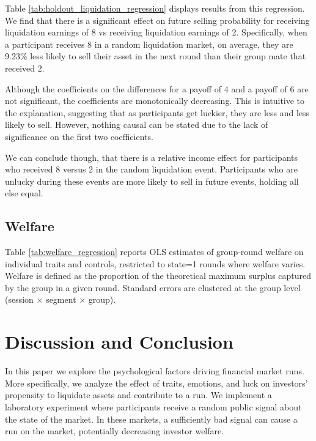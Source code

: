 \documentclass[11pt]{article}
\begin{document}
\begin{table}[H]
  \centering
  \caption{Effect of holdout liquidation payoff on next-round selling}
  \label{tab:holdout_liquidation_regression}
  
\end{table}

Table \ref{tab:holdout_liquidation_regression} displays results from this regression. We find that there is a significant effect on future selling probability for receiving liquidation earnings of 8 vs receiving liquidation earnings of 2. Specifically, when a participant receives 8 in a random liquidation market, on average, they are 9.23\% less likely to sell their asset in the next round than their group mate that received 2.

Although the coefficients on the differences for a payoff of 4 and a payoff of 6 are not significant, the coefficients are monotonically decreasing. This is intuitive to the explanation, suggesting that as participants get luckier, they are less and less likely to sell. However, nothing causal can be stated due to the lack of significance on the first two coefficients.

We can conclude though, that there is a relative income effect for participants who received 8 versus 2 in the random liquidation event. Participants who are unlucky during these events are more likely to sell in future events, holding all else equal.

\subsection{Welfare}

Table \ref{tab:welfare_regression} reports OLS estimates of group-round welfare on individual traits and controls, restricted to state=1 rounds where welfare varies. Welfare is defined as the proportion of the theoretical maximum surplus captured by the group in a given round. Standard errors are clustered at the group level (session $\times$ segment $\times$ group).

\begin{table}[H]
  \centering
  \caption{Welfare regression on individual traits}
  \label{tab:welfare_regression}
  
\end{table}

\section{Discussion and Conclusion}
In this paper we explore the psychological factors driving financial market runs. More specifically, we analyze the effect of traits, emotions, and luck on investors' propensity to liquidate assets and contribute to a run. We implement a laboratory experiment where participants receive a random public signal about the state of the market. In these markets, a sufficiently bad signal can cause a run on the market, potentially decreasing investor welfare. 
\end{document}
